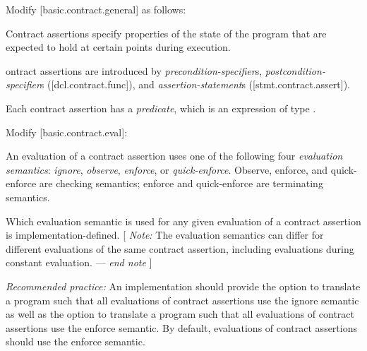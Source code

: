 Modify [basic.contract.general] as follows:
\begin{adjustwidth}{0.5cm}{0.5cm}
Contract assertions specify properties of the state of the program that are expected to hold at certain points during execution.

ontract assertions are introduced by \emph{precondition-specifier}s, \emph{postcondition-specifier}s ([dcl.contract.func]), and \emph{assertion-statement}s ([stmt.contract.assert]). 

Each contract assertion has a \emph{predicate}, which is an expression of type .  
\end{adjustwidth}

Modify [basic.contract.eval]:

\begin{adjustwidth}{0.5cm}{0.5cm}
An evaluation of a contract assertion uses one of the following four \emph{evaluation semantics}: \emph{ignore}, \emph{observe}, \emph{enforce}, or \emph{quick-enforce}. Observe, enforce, and quick-enforce are checking semantics; enforce and quick-enforce are terminating semantics.

Which evaluation semantic is used for any given evaluation of a contract assertion is implementation-defined.  [ \emph{Note:} The evaluation semantics can differ for different evaluations of the same contract assertion, including evaluations during constant evaluation. --- \emph{end note} ]

\emph{Recommended practice:} An implementation should provide the option to translate a program such that all evaluations of contract assertions use the ignore semantic as well as the option to translate a program such that all evaluations of contract assertions use the enforce semantic. By default, evaluations of contract assertions should use the enforce semantic.
\end{adjustwidth}

